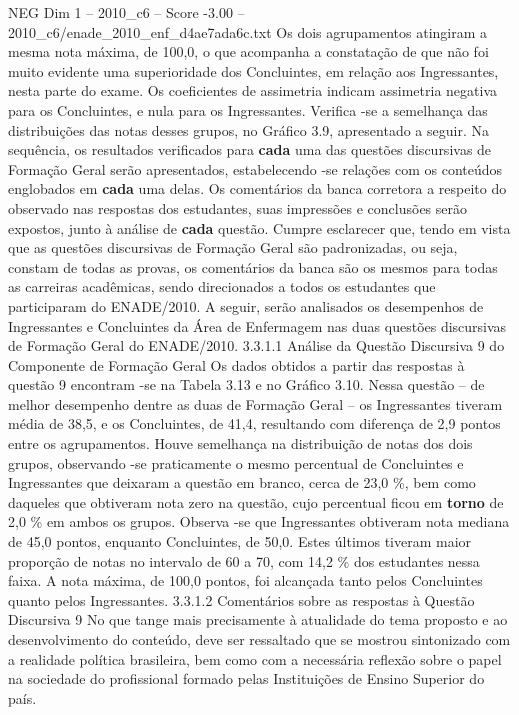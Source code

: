 \begin{textsample}{NEG Dim 1 – 2010\_c6 – Score -3.00 – 2010\_c6/enade\_2010\_enf\_d4ae7ada6c.txt}
Os dois agrupamentos atingiram a mesma nota máxima, de 100,0, o que acompanha a constatação de que não foi muito evidente uma superioridade dos Concluintes, em relação aos Ingressantes, nesta parte do exame.
Os coeficientes de assimetria indicam assimetria negativa para os Concluintes, e nula para os Ingressantes.
Verifica -se a semelhança das distribuições das notas desses grupos, no Gráfico 3.9, apresentado a seguir.
Na sequência, os resultados verificados para \textbf{cada} uma das questões discursivas de Formação Geral serão apresentados, estabelecendo -se relações com os conteúdos englobados em \textbf{cada} uma delas.
Os comentários da banca corretora a respeito do observado nas respostas dos estudantes, suas impressões e conclusões serão expostos, junto à análise de \textbf{cada} questão.
Cumpre esclarecer que, tendo em vista que as questões discursivas de Formação Geral são padronizadas, ou seja, constam de todas as provas, os comentários da banca são os mesmos para todas as carreiras acadêmicas, sendo direcionados a todos os estudantes que participaram do ENADE/2010.
A seguir, serão analisados os desempenhos de Ingressantes e Concluintes da Área de Enfermagem nas duas questões discursivas de Formação Geral do ENADE/2010. 3.3.1.1 Análise da Questão Discursiva 9 do Componente de Formação Geral Os dados obtidos a partir das respostas à questão 9 encontram -se na Tabela 3.13 e no Gráfico 3.10.
Nessa questão – de melhor desempenho dentre as duas de Formação Geral – os Ingressantes tiveram média de 38,5, e os Concluintes, de 41,4, resultando com diferença de 2,9 pontos entre os agrupamentos.
Houve semelhança na distribuição de notas dos dois grupos, observando -se praticamente o mesmo percentual de Concluintes e Ingressantes que deixaram a questão em branco, cerca de 23,0 \%, bem como daqueles que obtiveram nota zero na questão, cujo percentual ficou em \textbf{torno} de 2,0 \% em ambos os grupos.
Observa -se que Ingressantes obtiveram nota mediana de 45,0 pontos, enquanto Concluintes, de 50,0.
Estes últimos tiveram maior proporção de notas no intervalo de 60 a 70, com 14,2 \% dos estudantes nessa faixa.
A nota máxima, de 100,0 pontos, foi alcançada tanto pelos Concluintes quanto pelos Ingressantes. 3.3.1.2 Comentários sobre as respostas à Questão Discursiva 9 No que tange mais precisamente à atualidade do tema proposto e ao desenvolvimento do conteúdo, deve ser ressaltado que se mostrou sintonizado com a realidade política brasileira, bem como com a necessária reflexão sobre o papel na sociedade do profissional formado pelas Instituições de Ensino Superior do país.

\end{textsample}
